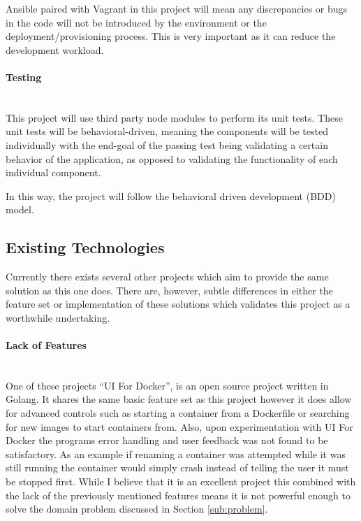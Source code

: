 \documentclass{article}
\begin{document}
Ansible paired with Vagrant in this project will mean any discrepancies or bugs in the code will not be introduced by the environment or the deployment/provisioning process. This is very important as it can reduce the development workload. 

\paragraph{Testing}\mbox{}\\
This project will use third party node modules to perform its unit tests. These unit tests will be behavioral-driven, meaning the components will be tested individually with the end-goal of the passing test being validating a certain behavior of the application, as opposed to validating the functionality of each individual component.

In this way, the project will follow the behavioral driven development (BDD) model. 

\subsection{Existing Technologies}

Currently there exists several other projects which aim to provide the same solution as this one does. There are, however, subtle differences in either the feature set or implementation of these solutions which validates this project as a worthwhile undertaking. 

\paragraph{Lack of Features}\mbox{}\\
One of these projects ``UI For Docker'', is an open source project written in Golang. It shares the same basic feature set as this project however it does allow for advanced controls such as starting a container from a Dockerfile or searching for new images to start containers from. Also, upon experimentation with UI For Docker the programs error handling and user feedback was not found to be satisfactory. As an example if renaming a container was attempted while it was still running the container would simply crash instead of telling the user it must be stopped first. While I believe that it is an excellent project this combined with the lack of the previously mentioned features means it is not powerful enough to solve the domain problem discussed in Section \ref{sub:problem}. 
\end{document}
